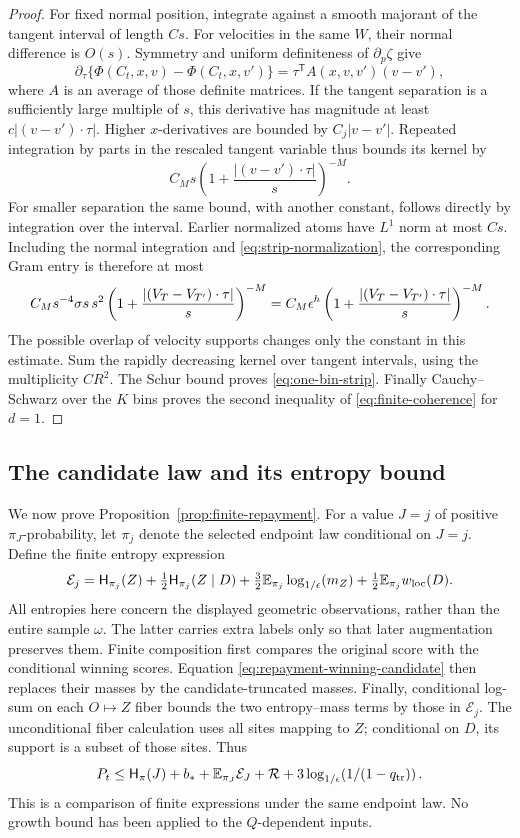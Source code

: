 \begin{proof}
For fixed normal position, integrate against a smooth majorant
of the tangent interval of length \(Cs\).  For velocities in
the same \(W\), their normal difference is \(O(s)\).  Symmetry
and uniform definiteness of \(\partial_p\zeta\) give
\[
 \partial_\tau\{\Phi(C_t,x,v)-\Phi(C_t,x,v')\}
       =\tau^{\mathsf T}A(x,v,v')(v-v'),
\]
where \(A\) is an average of those definite matrices.
If the tangent separation is a sufficiently large multiple of
\(s\), this derivative has magnitude at least
\(c|(v-v')\cdot\tau|\).
Higher \(x\)-derivatives are bounded by \(C_j|v-v'|\).
Repeated integration by parts in the rescaled tangent variable
thus bounds its kernel by
\[
 C_Ms\left(1+\frac{|(v-v')\cdot\tau|}{s}\right)^{-M}.
\]
For smaller separation the same bound, with another constant,
follows directly by integration over the interval.
Earlier normalized atoms have \(L^1\) norm at most \(Cs\).
Including the normal integration and
\eqref{eq:strip-normalization}, the corresponding Gram entry
is therefore at most
\[
 C_Ms^{-4}\sigma s\,s^2
  \left(1+\frac{|(V_T-V_{T'})\cdot\tau|}{s}\right)^{-M}
 =
 C_M\epsilon^h
  \left(1+\frac{|(V_T-V_{T'})\cdot\tau|}{s}\right)^{-M}.
\]
The possible overlap of velocity supports changes only the
constant in this estimate.  Sum the rapidly decreasing kernel
over tangent intervals, using the multiplicity \(CR^2\).
The Schur bound proves \eqref{eq:one-bin-strip}.
Finally Cauchy--Schwarz over the \(K\) bins proves the second
inequality of \eqref{eq:finite-coherence} for \(d=1\).
\end{proof}


\subsection{The candidate law and its entropy bound}

We now prove Proposition~\ref{prop:finite-repayment}.
For a value \(J=j\) of positive \(\pi_J\)-probability, let
\(\pi_j\) denote the selected endpoint law conditional on \(J=j\).
Define the finite entropy expression
\[
 \mathcal E_j=
 \mathsf H_{\pi_j}(Z)+\tfrac12\mathsf H_{\pi_j}(Z\mid D)
 +\tfrac32\mathbb E_{\pi_j}\log_{1/\epsilon}\!\left(m_Z\right)
 +\tfrac12\mathbb E_{\pi_j}w_{\rm loc}(D).
\]
All entropies here concern the displayed geometric observations,
rather than the entire sample \(\omega\).  The latter carries
extra labels only so that later augmentation preserves them.
Finite composition first compares the original score with the
conditional winning scores.  Equation
\eqref{eq:repayment-winning-candidate} then replaces their masses
by the candidate-truncated masses.  Finally, conditional log-sum
on each \(O\mapsto Z\) fiber bounds the two entropy--mass terms
by those in \(\mathcal E_j\).  The unconditional fiber calculation
uses all sites mapping to \(Z\); conditional on \(D\), its support
is a subset of those sites.  Thus
\begin{equation}
 P_t\le \mathsf H_\pi(J)+b_*+\mathbb E_{\pi_J}\mathcal E_J
       +\mathcal R+3\log_{1/\epsilon}\!\left(1/(1-q_{\rm tr})\right).
 \label{eq:repayment-candidate-expression}
\end{equation}
This is a comparison of finite expressions under the same endpoint
law.  No growth bound has been applied to the \(Q\)-dependent inputs.

